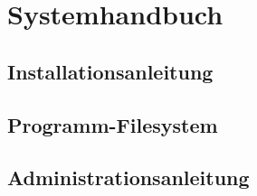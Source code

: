 \chapter{Systemhandbuch}
\section{Installationsanleitung}

\section{Programm-Filesystem}

\section{Administrationsanleitung}